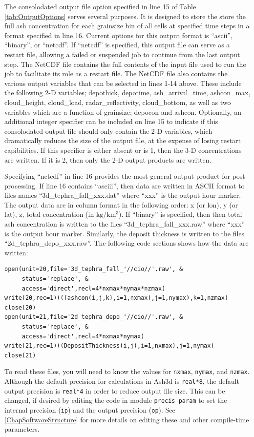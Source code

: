 The consolodated output file option specified in line 15 of Table \ref{tab:OutputOptions}
serves several purposes.  It is designed to store the store the full ash concentration
for each grainsize bin
of all cells at specified time steps in a format specified in line 16.  Current options
for this output format is ``ascii'', ``binary'', or ``netcdf''.  If ``netcdf''
is specified, this output file can serve as a restart file, allowing a failed or
suspended job to continue from the last output step.  The NetCDF file contains
the full contents of the input file used to run the job to facilitate its
role as a restart file.  
The NetCDF file also contains the various output variables that can be selected
in lines 1-14 above.  These include the following 2-D variables;
depothick, depotime, ash\_arrival\_time, ashcon\_max, cloud\_height,
cloud\_load, radar\_reflectivity, cloud\_bottom, as well as two variables
which are a function of grainsize; depocon and ashcon.
Optionally, an additional integer specifier can be included on
line 15 to indicate if this consolodated output file should only contain the
2-D variables, which dramatically reduces the size of the output file, at the
expense of losing restart capibilities.
If this specifier is either absent or is 1, then the 3-D concentrations are written.
If it is 2, then only the 2-D output products are written.

Specifying ``netcdf'' in line 16 provides the most general output product for post
processing.  If line 16 contains ``asciii'', then data are written in ASCII format
to files names ``3d\_tephra\_fall\_xxx.dat'' where ``xxx'' is the output hour marker.
The output data are in column format in the following order: x (or lon), y (or lat), z,
total concentration (in $\mathrm{kg/km^3}$).
If ``binary'' is specified, then then total ash concentration is written to the files
``3d\_tephra\_fall\_xxx.raw'' where ``xxx'' is the output hour marker.
Similarly, the deposit thickness is written to the files ``2d\_tephra\_depo\_xxx.raw''.
The following
code sections shows how the data are written:
\begin{verbatim}
open(unit=20,file='3d_tephra_fall_'//cio//'.raw', &
     status='replace', &
     access='direct',recl=4*nxmax*nymax*nzmax)
write(20,rec=1)(((ashcon(i,j,k),i=1,nxmax),j=1,nymax),k=1,nzmax)
close(20)
open(unit=21,file='2d_tephra_depo_'//cio//'.raw', &
     status='replace', &
     access='direct',recl=4*nxmax*nymax)
write(21,rec=1)((DepositThickness(i,j),i=1,nxmax),j=1,nymax)
close(21)
\end{verbatim}
To read these files, you will need to know the values for \texttt{nxmax},
\texttt{nymax}, and \texttt{nzmax}.  Although the default precision for
calculations in Ash3d is \texttt{real*8}, the default output precision is
\texttt{real*4} in order to reduce output file size.  This can be changed, if desired
by editing the code in module \texttt{precis\_param} to set the internal
precision (\texttt{ip}) and the output precision (\texttt{op}).
See \ref{ChapSoftwareStructure}
for more details on editing these and other compile-time parameters.

